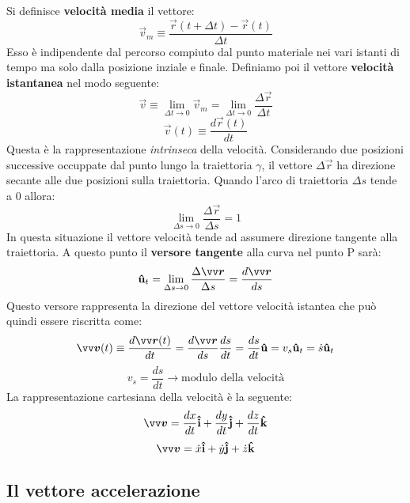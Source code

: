 \noindent Si definisce \textbf{velocità media} il vettore:
\[
     \vec{v}_m \equiv \frac{\vec{r}(t + \Delta t)-\vec{r}(t)}{\Delta t}    
\]
Esso è indipendente dal percorso compiuto dal punto materiale nei vari istanti di tempo ma solo dalla posizione
inziale e finale.
Definiamo poi il vettore \textbf{velocità istantanea} nel modo seguente:
\[
\vec{v} \equiv \lim_{\Delta t \to 0} \vec{v}_m = \lim_{\Delta t \to 0} \frac{\Delta \vec{r}}{\Delta t}      
\]
\[
\vec{v}(t) \equiv \frac{d \vec{r}(t)}{dt}   
\]
Questa è la rappresentazione \emph{intrinseca} della velocità. Considerando due posizioni successive occuppate dal 
punto lungo la traiettoria $\gamma $, il vettore $\Delta \vec{r}$ ha direzione secante alle due posizioni sulla traiettoria. 
Quando l'arco di traiettoria $\Delta s$ tende a 0 allora:
\[
    \lim_{\Delta s \to 0} \frac{\Delta \vec{r}}{\Delta s} = 1
\]
In questa situazione il vettore velocità tende ad assumere direzione tangente alla traiettoria. A questo punto il 
\textbf{versore tangente} alla curva nel punto P sarà:
\[
   \v{u}_t = \lim_{\Delta s \to 0} \frac{\Delta \vec{r}}{\Delta s} = \frac{d \vec{r}}{ds}
\]
Questo versore rappresenta la direzione del vettore velocità istantea che può quindi essere riscritta come:
\[
    \vec{v}(t) \equiv \frac{d \vec{r}(t)}{dt} = \frac{d\vec{r}}{ds} \frac{ds}{dt} = \frac{ds}{dt} \v{u}
    = v_s \v{u}_t = \dot{s} \v{u}_t 
\]
\[
 v_s =  \frac{ds}{dt}     \longrightarrow \text{modulo della velocità}
\]
La rappresentazione cartesiana della velocità è la seguente:
\[
 \vec{v} =  \frac{dx}{dt} \v{i} + \frac{dy}{dt} \v{j} + \frac{dz}{dt} \v{k}    
\]
\[
\vec{v} = \dot{x}\v{i} +  \dot{y}\v{j} +  \dot{z}\v{k}    
\]
\subsection*{Il vettore accelerazione}

